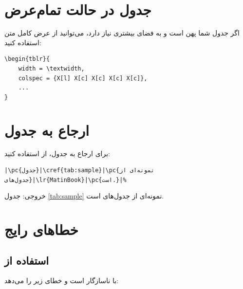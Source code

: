 
\section{جدول در حالت تمام‌عرض}
\label{sec:tables-fullwidth}

اگر جدول شما پهن است و به فضای بیشتری نیاز
دارد، می‌توانید از عرض کامل متن استفاده کنید:

\begin{latin}
\begin{verbatim}
\begin{tblr}{
    width = \textwidth,
    colspec = {X[l] X[c] X[c] X[c] X[c]},
    ...
}
\end{verbatim}
\end{latin}


\section{ارجاع به جدول}
\label{sec:tables-references}

برای ارجاع به جدول، از  استفاده کنید:

\begin{latin}
\begin{verbatim}
|\pc{جدول}|\cref{tab:sample}|\pc{نمونه‌ای از جدول‌های}|\lr{MatinBook}|\pc{است.}|%
\end{verbatim}
\end{latin}

خروجی: جدول \cref{tab:sample} نمونه‌ای از جدول‌های
 است.


\section{خطاهای رایج}
\label{sec:tables-mistakes}

\subsection{استفاده از }
\label{sec:tables-mistake-tabularx}

 با  ناسازگار است و
خطای زیر را می‌دهد:

